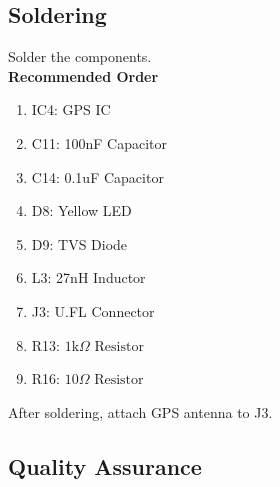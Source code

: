 \documentclass{article}
\newcommand{\resistor}[1]{$\text{#1} \Omega \text{ Resistor}$}
\begin{document}
\subsection{Soldering}

Solder the components. \\

\noindent \textbf{Recommended Order}

\begin{enumerate}
  \item IC4: GPS IC
  \item C11: 100nF Capacitor
  \item C14: 0.1uF Capacitor
  \item D8: Yellow LED
  \item D9: TVS Diode
  \item L3: 27nH Inductor
  \item J3: U.FL Connector
  \item R13: \resistor{1k}
  \item R16: \resistor{10}
\end{enumerate}

After soldering, attach GPS antenna to J3.

\subsection{Quality Assurance}
\end{document}
